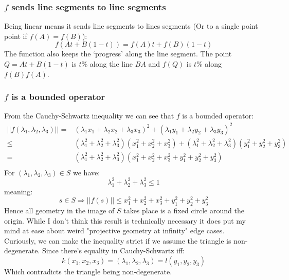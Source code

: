 \subsubsection{$f$ sends line segments to line segments}
Being linear means it sends line segments to lines segments (Or to a single point point if $f(A)=f(B)$):
\[f(At+B(1-t)) = f(A)t+f(B)(1-t)\] 
The function also keeps the `progress' along the line segment.
The point $Q=At+B(1-t)$ is $t$\% along the line $BA$ and $f(Q)$ is $t$\% along $f(B)f(A)$.

\subsubsection{$f$ is a bounded operator}
From the Cauchy-Schwartz inequality we can see that $f$ is a bounded operator:
\begin{equation*}
\begin{aligned}
	||f(\lambda_1,\lambda_2,\lambda_3)||
	=&(\lambda_1x_1+\lambda_2x_2+\lambda_3x_3)^2+(\lambda_1y_1+\lambda_2y_2+\lambda_3y_3)^2\\
	\leq&(\lambda_1^2+\lambda_2^2+\lambda_3^2)(x_1^2+x_2^2+x_3^2)+(\lambda_1^2+\lambda_2^2+\lambda_3^2)(y_1^2+y_2^2+y_3^2)\\
	=&(\lambda_1^2+\lambda_2^2+\lambda_3^2)(x_1^2+x_2^2+x_3^2+y_1^2+y_2^2+y_3^2)\\
\end{aligned}
\end{equation*}
For $(\lambda_1,\lambda_2,\lambda_3)\in S$ we have:
\[\lambda_1^2+\lambda_2^2+\lambda_3^2 \leq 1\]
meaning:
\[s\in S \Rightarrow ||f(s)|| \leq x_1^2+x_2^2+x_3^2+y_1^2+y_2^2+y_3^2\]
Hence all geometry in the image of $S$ takes place is a fixed circle around the origin.
While I don't think this result is technically necessary it does put my mind at ease about weird "projective geometry at infinity" edge cases.
\\

Curiously, 
we can make the inequality strict if we assume the triangle is non-degenerate.
Since there's equality in Cauchy-Schwartz iff:
\[k(x_1,x_2,x_3)=(\lambda_1,\lambda_2,\lambda_3)=l(y_1,y_2,y_3)\]
Which contradicts the triangle being non-degenerate.

